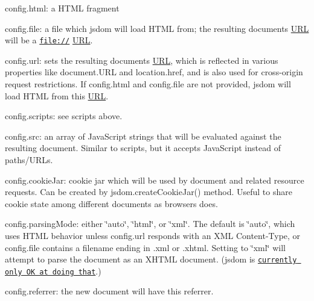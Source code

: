 \begin{DoxyItemize}
\item {\ttfamily config.\+html}\+: a H\+T\+ML fragment
\item {\ttfamily config.\+file}\+: a file which jsdom will load H\+T\+ML from; the resulting document\textquotesingle{}s \mbox{\hyperlink{namespace_u_r_l}{U\+RL}} will be a {\ttfamily \href{file://}{\tt file\+://}} \mbox{\hyperlink{namespace_u_r_l}{U\+RL}}.
\item {\ttfamily config.\+url}\+: sets the resulting document\textquotesingle{}s \mbox{\hyperlink{namespace_u_r_l}{U\+RL}}, which is reflected in various properties like {\ttfamily document.\+U\+RL} and {\ttfamily location.\+href}, and is also used for cross-\/origin request restrictions. If {\ttfamily config.\+html} and {\ttfamily config.\+file} are not provided, jsdom will load H\+T\+ML from this \mbox{\hyperlink{namespace_u_r_l}{U\+RL}}.
\item {\ttfamily config.\+scripts}\+: see {\ttfamily scripts} above.
\item {\ttfamily config.\+src}\+: an array of Java\+Script strings that will be evaluated against the resulting document. Similar to {\ttfamily scripts}, but it accepts Java\+Script instead of paths/\+U\+R\+Ls.
\item {\ttfamily config.\+cookie\+Jar}\+: cookie jar which will be used by document and related resource requests. Can be created by {\ttfamily jsdom.\+create\+Cookie\+Jar()} method. Useful to share cookie state among different documents as browsers does.
\item {\ttfamily config.\+parsing\+Mode}\+: either {\ttfamily \char`\"{}auto\char`\"{}}, {\ttfamily \char`\"{}html\char`\"{}}, or {\ttfamily \char`\"{}xml\char`\"{}}. The default is {\ttfamily \char`\"{}auto\char`\"{}}, which uses H\+T\+ML behavior unless {\ttfamily config.\+url} responds with an X\+ML {\ttfamily Content-\/\+Type}, or {\ttfamily config.\+file} contains a filename ending in {\ttfamily .xml} or {\ttfamily .xhtml}. Setting to {\ttfamily \char`\"{}xml\char`\"{}} will attempt to parse the document as an X\+H\+T\+ML document. (jsdom is \href{https://github.com/tmpvar/jsdom/labels/x%28ht%29ml}{\tt currently only OK at doing that}.)
\item {\ttfamily config.\+referrer}\+: the new document will have this referrer.

\end{DoxyItemize}
